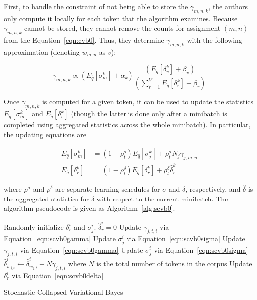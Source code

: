 \documentclass[11pt]{article}
\begin{document}
First, to handle the constraint of not being able to store the
$\gamma_{m,n,k}$, the authors only compute it locally for each token that
the algorithm examines. Because $\gamma_{m,n,k}$ cannot be stored, they
cannot remove the counts for assignment $(m,n)$ from the
Equation~\ref{eqn:cvb0}. Thus, they determine $\gamma_{m,n,k}$ with the
following approximation (denoting $w_{m,n}$ as $v$):

\begin{equation}
  \gamma_{m,n,k} \propto \left(E_{\hat{q}}[\sigma_m^k] + \alpha_k\right)
  \frac{\left(E_{\hat{q}}[\delta_v^k] + \beta_v\right)}
  {\left(\sum_{r=1}^V E_{\hat{q}}[\delta_r^k] + \beta_r\right)}
  \label{eqn:scvb0gamma}
\end{equation}

Once $\gamma_{m,n,k}$ is computed for a given token, it can be used to
update the statistics $E_{\hat{q}}[\sigma_m^k]$ and
$E_{\hat{q}}[\delta_v^k]$ (though the latter is done only after a minibatch
is completed using aggregated statistics across the whole minibatch). In
particular, the updating equations are

\begin{align}
  E_{\hat{q}}[\sigma_m^k] &=
  (1-\rho_t^\sigma) E_{\hat{q}}[\sigma_j^k] + \rho_t^\sigma N_j \gamma_{j,m,n}
  \label{eqn:scvb0sigma} \\
  E_{\hat{q}}[\delta_r^k] &=
  (1-\rho_t^\delta) E_{\hat{q}}[\delta_r^k] + \rho_t^\delta \hat{\delta}_r^k
  \label{eqn:scvb0delta}
\end{align}

where $\rho^\sigma$ and $\rho^\delta$ are separate learning schedules for
$\sigma$ and $\delta$, respectively, and $\hat{\delta}$ is the aggregated
statistics for $\delta$ with respect to the current minibatch. The
algorithm pseudocode is given as Algorithm~\ref{alg:scvb0}.

\begin{algorithm}
  \begin{algorithmic}
    \State Randomly initialize $\delta_r^i$ and $\sigma_j^i$.
      \State $\hat{\delta}_r^i = 0$
            \State Update $\gamma_{j,t,i}$ via Equation~\ref{eqn:scvb0gamma}
            \State Update $\sigma_j^i$ via Equation~\ref{eqn:scvb0sigma}
          \EndFor
        \EndFor
          \State Update $\gamma_{j,t,i}$ via Equation~\ref{eqn:scvb0gamma}
          \State Update $\sigma_j^i$ via Equation~\ref{eqn:scvb0sigma}
          \State $\hat{\delta}_{w_{j,t}}^i \leftarrow \hat{\delta}_{w_{j,t}}^i +
          N\gamma_{j,t,i}$ where $N$ is the total number of tokens in the
          corpus
        \EndFor
        \State Update $\delta_r^i$ via Equation~\ref{eqn:scvb0delta}
      \EndFor
    \EndFor
  \end{algorithmic}
  \caption{Stochastic Collapsed Variational Bayes}
  \label{alg:scvb0}
\end{algorithm}
\end{document}

